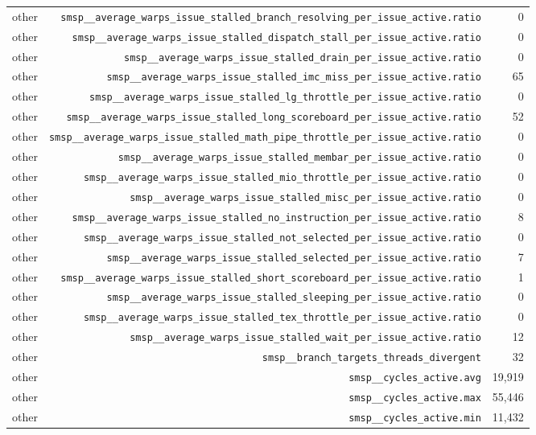 \begin{table}[h]
\begin{tabular}{|l|r|r|}
other & \texttt{smsp__average_warps_issue_stalled_branch_resolving_per_issue_active.ratio} & 0 \\
other & \texttt{smsp__average_warps_issue_stalled_dispatch_stall_per_issue_active.ratio} & 0 \\
other & \texttt{smsp__average_warps_issue_stalled_drain_per_issue_active.ratio} & 0 \\
other & \texttt{smsp__average_warps_issue_stalled_imc_miss_per_issue_active.ratio} & 65 \\
other & \texttt{smsp__average_warps_issue_stalled_lg_throttle_per_issue_active.ratio} & 0 \\
other & \texttt{smsp__average_warps_issue_stalled_long_scoreboard_per_issue_active.ratio} & 52 \\
other & \texttt{smsp__average_warps_issue_stalled_math_pipe_throttle_per_issue_active.ratio} & 0 \\
other & \texttt{smsp__average_warps_issue_stalled_membar_per_issue_active.ratio} & 0 \\
other & \texttt{smsp__average_warps_issue_stalled_mio_throttle_per_issue_active.ratio} & 0 \\
other & \texttt{smsp__average_warps_issue_stalled_misc_per_issue_active.ratio} & 0 \\
other & \texttt{smsp__average_warps_issue_stalled_no_instruction_per_issue_active.ratio} & 8 \\
other & \texttt{smsp__average_warps_issue_stalled_not_selected_per_issue_active.ratio} & 0 \\
other & \texttt{smsp__average_warps_issue_stalled_selected_per_issue_active.ratio} & 7 \\
other & \texttt{smsp__average_warps_issue_stalled_short_scoreboard_per_issue_active.ratio} & 1 \\
other & \texttt{smsp__average_warps_issue_stalled_sleeping_per_issue_active.ratio} & 0 \\
other & \texttt{smsp__average_warps_issue_stalled_tex_throttle_per_issue_active.ratio} & 0 \\
other & \texttt{smsp__average_warps_issue_stalled_wait_per_issue_active.ratio} & 12 \\
other & \texttt{smsp__branch_targets_threads_divergent} & 32 \\
other & \texttt{smsp__cycles_active.avg} & 19,919 \\
other & \texttt{smsp__cycles_active.max} & 55,446 \\
other & \texttt{smsp__cycles_active.min} & 11,432 \\

\end{tabular}
\end{table}
